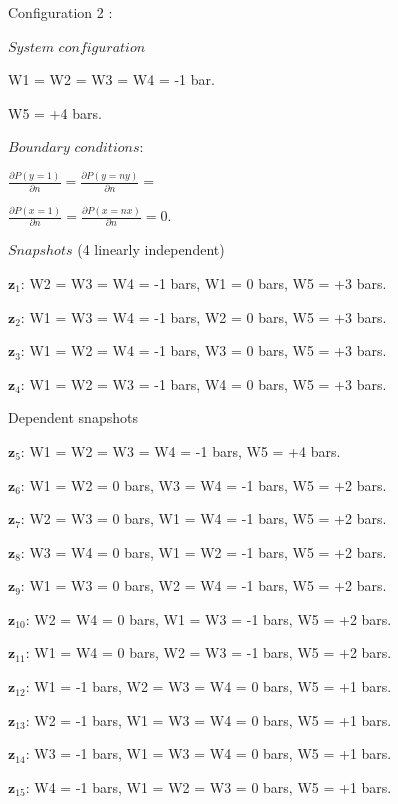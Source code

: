 \documentclass[12pt]{article}
\begin{document}
\begin{itemize}
\item[] Configuration 2 :\\
\begin{minipage}{.6\textwidth}
\item[]  $System$ $configuration$ 
 \item[]  W1 =  W2 = W3 = W4 = -1 bar.
 \item[] W5 = +4 bars.
 \end{minipage}%
\begin{minipage}{.4\textwidth}
\item[] $Boundary$ $conditions:$\\
\item[] $\frac{\partial P(y=1)}{\partial n}=\frac{\partial P(y=ny)}{\partial n}=$
\item[] $\frac{\partial P(x=1)}{\partial n}=\frac{\partial P(x=nx)}{\partial n}=0$.
\end{minipage}
\begin{minipage}{.8\textwidth}
\item[] $Snapshots$ (4 linearly independent) 
 \item[] $\mathbf{z}_1$:  W2 = W3 = W4 =  -1 bars, 
 W1 = 0 bars, W5 = +3 bars.
\item[] $\mathbf{z}_2$: W1 = W3 = W4 = -1 bars,
 W2 = 0 bars, W5 = +3 bars.
\item[] $\mathbf{z}_3$: W1 = W2 = W4 = -1 bars,
 W3 = 0 bars, W5 =  +3 bars.
\item[] $\mathbf{z}_4$:  W1 = W2 = W3 = -1 bars,
 W4 = 0 bars, W5 =  +3 bars.
\item[] Dependent snapshots
\item[] $\mathbf{z}_5$: W1 = W2 = W3 = W4 =  -1 bars, 
 W5 =  +4 bars.
\item[] $\mathbf{z}_6$: W1 = W2 = 0 bars,
 W3 = W4 = -1 bars, W5 =  +2 bars.
\item[] $\mathbf{z}_7$: W2 = W3 = 0 bars, 
 W1 = W4 = -1 bars, W5 = +2 bars.
\item[] $\mathbf{z}_8$: W3 = W4 = 0 bars, 
 W1 = W2 = -1 bars, W5 =  +2 bars.
 \item[] $\mathbf{z}_9$: W1 = W3 = 0 bars, 
 W2 = W4 =  -1 bars, W5 = +2 bars.
\item[] $\mathbf{z}_{10}$: W2 = W4 = 0 bars, 
 W1 = W3 = -1 bars, W5 =  +2 bars.
\item[] $\mathbf{z}_{11}$: W1 = W4 = 0 bars, 
 W2 = W3 = -1 bars, W5 = +2 bars.
 \item[] $\mathbf{z}_{12}$: W1 = -1 bars, W2 = W3 = W4 =  0 bars, 
 W5 =  +1 bars.
\item[] $\mathbf{z}_{13}$: W2 = -1 bars, W1 = W3 = W4 = 0 bars,
 W5 = +1 bars.
\item[] $\mathbf{z}_{14}$: W3 = -1 bars, W1 = W3 = W4 = 0 bars,
 W5 = +1 bars.
\item[] $\mathbf{z}_{15}$: W4 = -1 bars, W1 = W2 = W3 = 0 bars,
 W5 =  +1 bars.
\end{minipage}%
\end{itemize}
\normalsize
\end{document}
